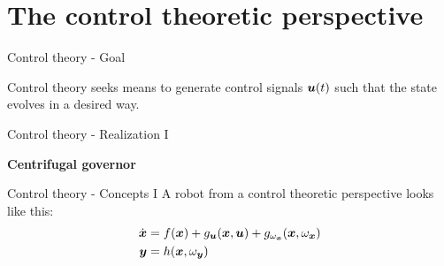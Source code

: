 \documentclass[usenames,dvipsnames,xcolor=table]{beamer}
\begin{document}
\section{The control theoretic perspective}
\begin{frame}{Control theory - Goal}
\begin{center}
{\large Control theory seeks means to generate control signals $ \boldsymbol{u} (t)$ such that the state evolves in a desired way. }
\end{center}
\end{frame}
\begin{frame}{Control theory - Realization I}
\begin{center}
	\vspace{-6pt}
    \textbf{\Large Centrifugal governor}
    \def\svgwidth{.5\linewidth}
    
\end{center}
\end{frame}
\begin{frame}{Control theory - Concepts I}
A robot from a control theoretic perspective looks like this:
\begin{align*}
     \dot{\boldsymbol{x}}  &= f( \boldsymbol{x} ) + g_{ \boldsymbol{u} }( \boldsymbol{x} ,  \boldsymbol{u} ) + g_{{\omega_{ \boldsymbol{x} }}}( \boldsymbol{x} , \omega_{ \boldsymbol{x} })  \\
     \boldsymbol{y}  &= h( \boldsymbol{x} , \omega_{ \boldsymbol{y} })
\end{align*}
\end{frame}
\end{document}

